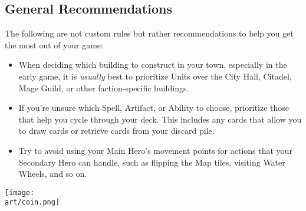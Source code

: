\begin{multicols}{2}

\subsection*{General Recommendations}

The following are not custom rules but rather recommendations to help you get the most out of your game:

\begin{itemize}
  \item When deciding which building to construct in your town, especially in the early game, it is \textit{usually} best to prioritize Units over the City Hall, Citadel, Mage Guild, or other faction-specific buildings.
  \item If you're unsure which Spell, Artifact, or Ability to choose, prioritize those that help you cycle through your deck.
    This includes any cards that allow you to draw cards or retrieve cards from your discard pile.
  \item Try to avoid using your Main Hero's movement points for actions that your Secondary Hero can handle, such as flipping the Map tiles, visiting Water Wheels, and so on.
\end{itemize}

\begin{center}
  \texttt{[image: \\art/coin.png]}
\end{center}

\end{multicols}
